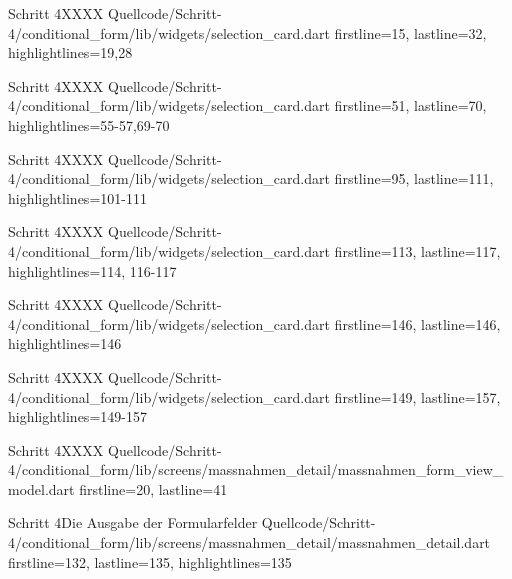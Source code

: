 










\begin{alexlisting}{Schritt 4}{XXXX}
    {Quellcode/Schritt-4/conditional_form/lib/widgets/selection_card.dart}
    {firstline=15, lastline=32, highlightlines={19,28}}
    \label{lst:Schritt4XXXX}
\end{alexlisting}

\begin{alexlisting}{Schritt 4}{XXXX}
    {Quellcode/Schritt-4/conditional_form/lib/widgets/selection_card.dart}
    {firstline=51, lastline=70, highlightlines={55-57,69-70}}
    \label{lst:Schritt4XXXX}
\end{alexlisting}

\begin{alexlisting}{Schritt 4}{XXXX}
    {Quellcode/Schritt-4/conditional_form/lib/widgets/selection_card.dart}
    {firstline=95, lastline=111, highlightlines={101-111}}
    \label{lst:Schritt4XXXX}
\end{alexlisting}


\begin{alexlisting}{Schritt 4}{XXXX}
    {Quellcode/Schritt-4/conditional_form/lib/widgets/selection_card.dart}
    {firstline=113, lastline=117, highlightlines={114, 116-117}}
    \label{lst:Schritt4XXXX}
\end{alexlisting}

\begin{alexlisting}{Schritt 4}{XXXX}
    {Quellcode/Schritt-4/conditional_form/lib/widgets/selection_card.dart}
    {firstline=146, lastline=146, highlightlines={146}}
    \label{lst:Schritt4XXXX}
\end{alexlisting}

\begin{alexlisting}{Schritt 4}{XXXX}
    {Quellcode/Schritt-4/conditional_form/lib/widgets/selection_card.dart}
    {firstline=149, lastline=157, highlightlines={149-157}}
    \label{lst:Schritt4XXXX}
\end{alexlisting}


\begin{alexlisting}{Schritt 4}{XXXX}
    {Quellcode/Schritt-4/conditional_form/lib/screens/massnahmen_detail/massnahmen_form_view_model.dart}
    {firstline=20, lastline=41}
    \label{lst:Schritt4XXXXX}
  \end{alexlisting}

  \begin{alexlisting}{Schritt 4}{Die Ausgabe der Formularfelder}
    {Quellcode/Schritt-4/conditional_form/lib/screens/massnahmen_detail/massnahmen_detail.dart}
    {firstline=132, lastline=135, highlightlines={135}}
    \label{lst:Schritt4XXXXX}
  \end{alexlisting}

